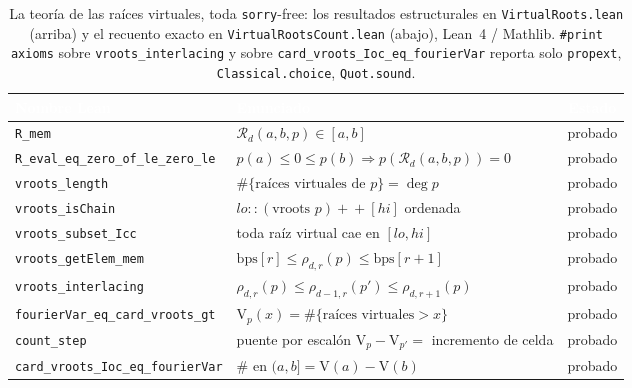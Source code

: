 \documentclass[11pt]{article}
\newcommand{\lean}[1]{\texttt{#1}}
\newcommand{\V}{\mathrm{V}}
\newcommand{\Rd}{\mathcal{R}}
\begin{document}
\begin{table}[H]
  \centering\footnotesize
  \begin{tabular}{@{}llc@{}}
    \toprule
    \rowcolor{ggteal}
    \textcolor{white}{\textbf{Nombre Lean}} & \textcolor{white}{\textbf{Enunciado}} & \textcolor{white}{\textbf{Estado}} \\
    \midrule
    \rowcolor{ggband}
    \lean{R\_mem} & $\Rd_d(a,b,p)\in[a,b]$ & probado \\
    \lean{R\_eval\_eq\_zero\_of\_le\_zero\_le} & $p(a)\!\le\!0\!\le\!p(b)\Rightarrow p(\Rd_d(a,b,p))=0$ & probado \\
    \rowcolor{ggband}
    \lean{vroots\_length} & $\#\{\text{ra\'ices virtuales de }p\}=\deg p$ & probado \\
    \lean{vroots\_isChain} & $lo::(\text{vroots }p)+\!\!+[hi]$ ordenada & probado \\
    \rowcolor{ggband}
    \lean{vroots\_subset\_Icc} & toda ra\'iz virtual cae en $[lo,hi]$ & probado \\
    \lean{vroots\_getElem\_mem} & $\mathrm{bps}[r]\le\rho_{d,r}(p)\le\mathrm{bps}[r{+}1]$ & probado \\
    \rowcolor{ggband}
    \lean{vroots\_interlacing} & $\rho_{d,r}(p)\le\rho_{d-1,r}(p')\le\rho_{d,r+1}(p)$ & probado \\
    \midrule
    \lean{fourierVar\_eq\_card\_vroots\_gt} & $\V_p(x)=\#\{\text{ra\'ices virtuales}>x\}$ & probado \\
    \rowcolor{ggband}
    \lean{count\_step} & puente por escal\'on $\V_p{-}\V_{p'}=$ incremento de celda & probado \\
    \lean{card\_vroots\_Ioc\_eq\_fourierVar} & $\#$ en $(a,b]=\V(a)-\V(b)$ & probado \\
    \bottomrule
  \end{tabular}
  \caption{La teor\'ia de las ra\'ices virtuales, toda \lean{sorry}-free: los resultados estructurales
  en \lean{VirtualRoots.lean} (arriba) y el recuento exacto en \lean{VirtualRootsCount.lean} (abajo),
  Lean~4 / Mathlib. \lean{\#print axioms} sobre \lean{vroots\_interlacing} y sobre
  \lean{card\_vroots\_Ioc\_eq\_fourierVar} reporta solo \lean{propext}, \lean{Classical.choice},
  \lean{Quot.sound}.}
  \label{tab:results}
\end{table}
\end{document}
